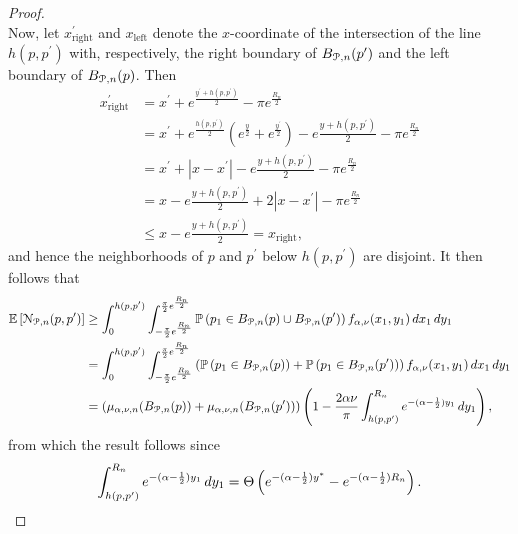 \begin{appendices}
\begin{proof}
\[\]
Now, let $x_{\mathrm{right}}^\prime$ and $x_{\mathrm{left}}$ denote the $x$-coordinate of the intersection of the line $h(p,p^\prime)$ with, respectively, the right boundary of $B_{{\mathcal P},n}(p^\prime)$ and the left boundary of $B_{{\mathcal P},n}(p)$. Then
\begin{align*}
	x_{\mathrm{right}}^\prime &= x^\prime + e^{\frac{y^\prime + h(p,p^\prime)}{2}} - \pi e^{\frac{R_n}{2}}\\
	&= x^\prime + e^{\frac{h(p,p^\prime)}{2}}\left(e^{\frac{y}{2}} + e^{\frac{y^\prime}{2}}\right)
		- e{\frac{y + h(p,p^\prime)}{2}} - \pi e^{\frac{R_n}{2}}\\
	&= x^\prime + |x - x^\prime| - e{\frac{y + h(p,p^\prime)}{2}} - \pi e^{\frac{R_n}{2}}\\
	&= x - e{\frac{y + h(p,p^\prime)}{2}} + 2|x - x^\prime| - \pi e^{\frac{R_n}{2}}\\
	&\le x - e{\frac{y + h(p,p^\prime)}{2}} = x_{\mathrm{right}},
\end{align*}
and hence the neighborhoods of $p$ and $p^\prime$ below $h(p,p^\prime)$ are disjoint. It then follows that
\begin{align*}
	\mathbb{E}\left[{\mathcal N}_{{\mathcal P},n}(p,p^\prime)\right] 
	&\ge \int_0^{h(p,p^\prime)} \int_{-\frac{\pi}{2}e^{\frac{R_n}{2}}}^{\frac{\pi}{2}e^{\frac{R_n}{2}}} 
		\mathbb{P}\left(p_1 \in B_{{\mathcal P},n}(p) \cup B_{{\mathcal P},n}(p^\prime)\right) f_{\alpha,\nu}(x_1,y_1) \, dx_1 \, dy_1\\
	&= \int_0^{h(p,p^\prime)} \int_{-\frac{\pi}{2}e^{\frac{R_n}{2}}}^{\frac{\pi}{2}e^{\frac{R_n}{2}}} 
		\left(\mathbb{P}\left(p_1 \in B_{{\mathcal P},n}(p)\right) + \mathbb{P}\left(p_1 \in B_{{\mathcal P},n}(p^\prime)\right)\right) 
		f_{\alpha,\nu}(x_1,y_1) \, dx_1 \, dy_1\\
	&= \left(\mu_{\alpha,\nu ,n}(B_{{\mathcal P},n}(p)) + \mu_{\alpha,\nu ,n}(B_{{\mathcal P},n}(p^\prime))\right)
		\left(1 - \frac{2\alpha \nu}{\pi}\int_{h(p,p^\prime)}^{R_n} e^{-(\alpha - \frac{1}{2})y_1} \, dy_1\right),
\end{align*}
from which the result follows since
\[
	\int_{h(p,p^\prime)}^{R_n} e^{-(\alpha - \frac{1}{2})y_1} \, dy_1 = \Theta\left(e^{-(\alpha - \frac{1}{2})y^\ast} - e^{-(\alpha - \frac{1}{2})R_n}\right).
\]
\end{proof}

\begin{figure}
\centering
{}
\end{figure}
\end{appendices}
